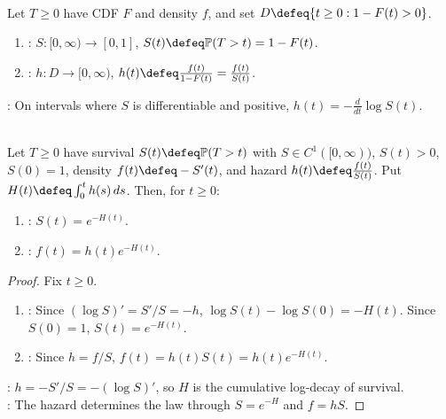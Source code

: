 \begin{definition} \label{def:survival-and-hazard-functions} \\
Let $T\geq0$ have CDF $F$ and density $f$, and set $D\defeq\{t\geq0:1-F(t)>0\}$.
\begin{enumerate}[label=(\roman*)]
\setlength{\itemsep}{0pt}
\item {}: $S:[0,\infty)\to[0,1]$, $S(t)\defeq\mathbb{P}(T>t)=1-F(t)$.
\item {}: $h:D\to[0,\infty)$, $h(t)\defeq \frac{f(t)}{1-F(t)}=\frac{f(t)}{S(t)}$.
\end{enumerate}
: On intervals where $S$ is differentiable and positive, $h(t)=-\frac{d}{dt}\log S(t)$.
\end{definition}

\begin{proposition} \label{prop:hazard-determines-density} \\
Let $T\geq0$ have survival $S(t)\defeq\mathbb{P}(T>t)$ with $S\in C^1([0,\infty))$, $S(t)>0$, $S(0)=1$, density $f(t)\defeq -S'(t)$, and hazard $h(t)\defeq\frac{f(t)}{S(t)}$. Put $H(t)\defeq\int_0^t h(s)\,ds$. Then, for $t\geq0$:
\begin{enumerate}[label=(\roman*)]
\setlength{\itemsep}{0pt}
\item {}: $S(t)=e^{-H(t)}$.
\item {}: $f(t)=h(t)e^{-H(t)}$.
\end{enumerate}
\begin{proof}
Fix $t\geq0$.
\begin{enumerate}[label=(\roman*)]
\setlength{\itemsep}{0pt}
\item {}: Since $(\log S)'=S'/S=-h$, $\log S(t)-\log S(0)=-H(t)$. Since $S(0)=1$, $S(t)=e^{-H(t)}$.
\item {}: Since $h=f/S$, $f(t)=h(t)S(t)=h(t)e^{-H(t)}$.
\end{enumerate}
: $h=-S'/S=-(\log S)'$, so $H$ is the cumulative log-decay of survival.\\
: The hazard determines the law through $S=e^{-H}$ and $f=hS$.
\end{proof}
\end{proposition}

